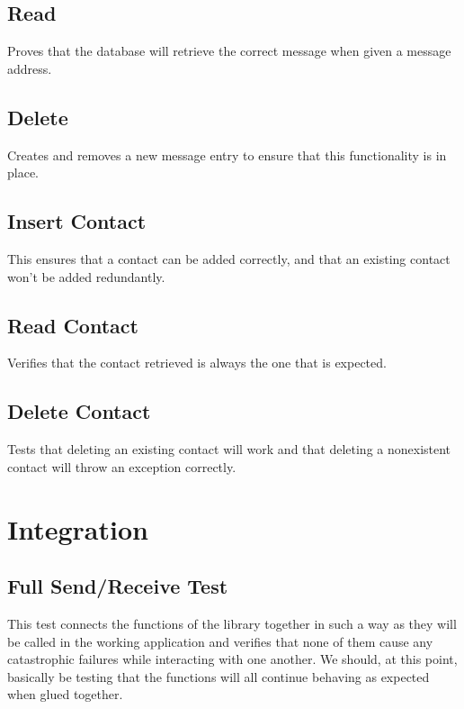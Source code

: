 \documentclass[titlepage]{report}
\begin{document}
\subsection{Read}
Proves that the database will retrieve the correct message when given a message address.
\subsection{Delete}
Creates and removes a new message entry to ensure that this functionality is in place.
\subsection{Insert Contact}
This ensures that a contact can be added correctly, and that an existing contact won't be added redundantly.
\subsection{Read Contact}
Verifies that the contact retrieved is always the one that is expected.
\subsection{Delete Contact}
Tests that deleting an existing contact will work and that deleting a nonexistent contact will throw an exception correctly.

\section{Integration}
\subsection{Full Send/Receive Test}
This test connects the functions of the library together in such a way as they will be called in the working application and verifies that none of them cause any catastrophic failures while interacting with one another. We should, at this point, basically be testing that the functions will all continue behaving as expected when glued together.
\end{document}
